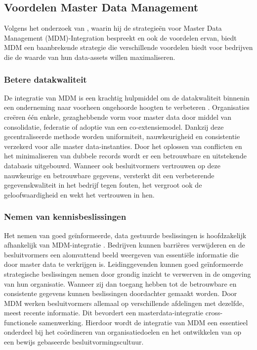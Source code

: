 \subsection{Voordelen Master Data Management}
Volgens het onderzoek van \textcite{Pansara2024}, waarin hij de strategieën voor Master Data Management (MDM)-Integration bespreekt en ook de voordelen ervan, biedt MDM een baanbrekende strategie die verschillende voordelen biedt voor bedrijven die de waarde van hun data-assets willen maximaliseren.

\subsubsection{Betere datakwaliteit}
De integratie van MDM is een krachtig hulpmiddel om de datakwaliteit binnenin een onderneming naar voorheen ongehoorde hoogten te verbeteren \autocite{Pansara2024}. Organisaties creëren één enkele, gezaghebbende vorm voor master data door middel van consolidatie, federatie of adoptie van een co-extensiemodel. Dankzij deze gecentraliseerde methode worden uniformiteit, nauwkeurigheid en consistentie verzekerd voor alle master data-instanties. Door het oplossen van conflicten en het minimaliseren van dubbele records wordt er een betrouwbare en uitstekende databasis uitgebouwd. Wanneer ook besluitvormers vertrouwen op deze nauwkeurige en betrouwbare gegevens, versterkt dit een verbeterende gegevenskwaliteit in het bedrijf tegen fouten, het vergroot ook de geloofwaardigheid en wekt het vertrouwen in hen.

\subsubsection{Nemen van kennisbeslissingen}
Het nemen van goed geïnformeerde, data gestuurde beslissingen is hoofdzakelijk afhankelijk van MDM-integratie \autocite{Pansara2024}. Bedrijven kunnen barrières verwijderen en de besluitvormers een alomvattend beeld weergeven van essentiële informatie die door master data te verkrijgen is. Leidinggevenden kunnen goed geïnformeerde strategische beslissingen nemen door grondig inzicht te verwerven in de omgeving van hun organisatie. Wanneer zij dan toegang hebben tot de betrouwbare en consistente gegevens kunnen beslissingen doordachter gemaakt worden. Door MDM werken besluitvormers allemaal op verschillende afdelingen met dezelfde, meest recente informatie. Dit bevordert een masterdata-integratie cross-functionele samenwerking. Hierdoor wordt de integratie van MDM een essentieel onderdeel bij het coördineren van organisatiedoelen en het ontwikkelen van op een bewijs gebaseerde besluitvormingscultuur.

